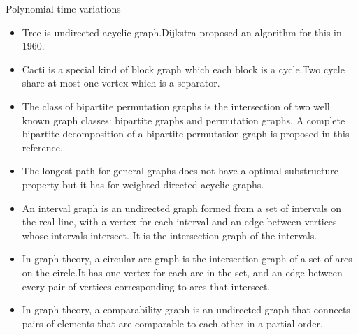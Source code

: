 \begin{frame}{Polynomial time variations}
    \centering
    \begin{itemize}
        \item <only@1> Tree is undirected acyclic graph.Dijkstra proposed an algorithm for this in 1960.
        \item <only@2>Cacti is a special kind of block graph which each block is a cycle.Two cycle share at most one vertex which is a separator.
        \item <only@3>The class of bipartite permutation graphs is the intersection of two well known graph classes: bipartite graphs and permutation graphs. A complete bipartite decomposition of a bipartite permutation graph is proposed in this reference.
        \item <only@4>The longest path for general graphs does not have a optimal substructure property but it has for weighted directed acyclic graphs.
        \item <only@5>An interval graph is an undirected graph formed from a set of intervals on the real line, with a vertex for each interval and an edge between vertices whose intervals intersect. It is the intersection graph of the intervals.
        \item <only@6>In graph theory, a circular-arc graph is the intersection graph of a set of arcs on the circle.It has one vertex for each arc in the set, and an edge between every pair of vertices corresponding to arcs that intersect.
        \item <only@7>In graph theory, a comparability graph is an undirected graph that connects pairs of elements that are comparable to each other in a partial order.
    \end{itemize}
\end{frame}




